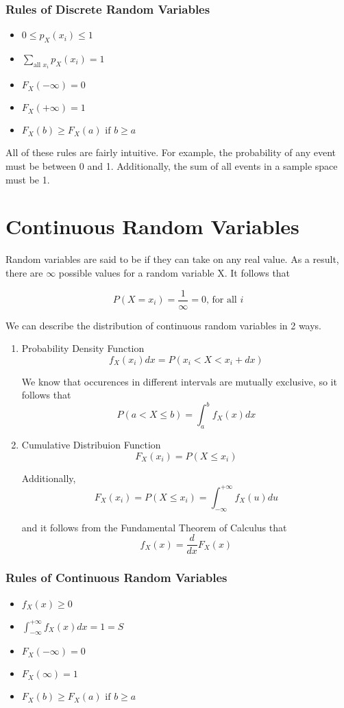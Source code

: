 \subsubsection*{Rules of Discrete Random Variables}
\begin{itemize}
    \item $0 \le p_X(x_i) \le 1$
    \item $\sum_{\text{all } x_i} p_X(x_i) = 1$
    \item $F_X(-\infty) = 0$
    \item $F_X(+\infty) = 1$
    \item $F_X(b) \ge F_X(a) \text{ if } b \ge a$
\end{itemize}
All of these rules are fairly intuitive. For example, the probability of any event must be between 0 and 1. Additionally, the sum of all events in a sample space must be 1. 

\section{Continuous Random Variables}
Random variables are said to be  if they can take on any real value. As a result, there are $\infty$ possible values for a random variable X. It follows that

\[
    P(X = x_i) = \frac{1}{\infty} = 0 \text{, for all } i
\]

We can describe the distribution of continuous random variables in 2 ways.
\begin{enumerate}
    \item Probability Density Function
    \[ 
        f_X(x_i)dx = P(x_i < X < x_i + dx)
    \]
    \begin{center}
    \end{center}

    We know that occurences in different intervals are mutually exclusive, so it follows that
    \[
        P(a < X \le b) = \int_a^bf_X(x)dx
    \]
    \item Cumulative Distribuion Function
    \[
        F_X(x_i) = P(X \le x_i)  
    \]
    \begin{center}
    \end{center}
    Additionally,
    \[
        F_X(x_i) = P(X \le x_i) = \int_{-\infty}^{+\infty} f_X(u)du
    \]

    and it follows from the Fundamental Theorem of Calculus that
    \[
        f_X(x) = \frac{d}{dx}F_X(x)
    \]
\end{enumerate}

\subsubsection*{Rules of Continuous Random Variables}
\begin{itemize}
    \item $f_X(x) \ge 0$
    \item $\int_{-\infty}^{+\infty}f_X(x)dx = 1 = S$
    \item $F_X(-\infty) = 0$
    \item $F_X({}\infty) = 1$ 
    \item $F_X(b) \ge F_X(a) \text{ if } b \ge a$
\end{itemize}